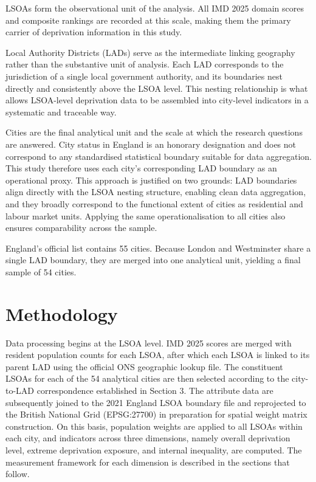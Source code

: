 \documentclass[11pt,journal,compsoc]{IEEEtran}
\begin{document}
LSOAs form the observational unit of the analysis. All IMD 2025 domain scores and composite rankings are recorded at this scale, making them the primary carrier of deprivation information in this study.

Local Authority Districts (LADs) serve as the intermediate linking geography rather than the substantive unit of analysis. Each LAD corresponds to the jurisdiction of a single local government authority, and its boundaries nest directly and consistently above the LSOA level. This nesting relationship is what allows LSOA-level deprivation data to be assembled into city-level indicators in a systematic and traceable way.

Cities are the final analytical unit and the scale at which the research questions are answered. City status in England is an honorary designation and does not correspond to any standardised statistical boundary suitable for data aggregation. This study therefore uses each city's corresponding LAD boundary as an operational proxy. This approach is justified on two grounds: LAD boundaries align directly with the LSOA nesting structure, enabling clean data aggregation, and they broadly correspond to the functional extent of cities as residential and labour market units. Applying the same operationalisation to all cities also ensures comparability across the sample.

England's official list contains 55 cities. Because London and Westminster share a single LAD boundary, they are merged into one analytical unit, yielding a final sample of 54 cities.
\section{Methodology}

Data processing begins at the LSOA level. IMD 2025 scores are merged with resident population counts for each LSOA, after which each LSOA is linked to its parent LAD using the official ONS geographic lookup file. The constituent LSOAs for each of the 54 analytical cities are then selected according to the city-to-LAD correspondence established in Section 3. The attribute data are subsequently joined to the 2021 England LSOA boundary file and reprojected to the British National Grid (EPSG:27700) in preparation for spatial weight matrix construction. On this basis, population weights are applied to all LSOAs within each city, and indicators across three dimensions, namely overall deprivation level, extreme deprivation exposure, and internal inequality, are computed. The measurement framework for each dimension is described in the sections that follow.
\end{document}
